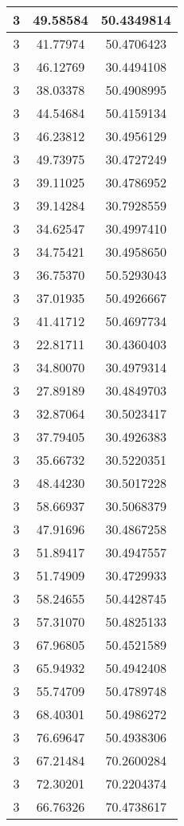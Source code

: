 \documentclass[
]{book}
\begin{document}
\begin{tabular}{c|c|c}
\hline
3 & 49.58584 & 50.4349814\\
\hline
3 & 41.77974 & 50.4706423\\
\hline
3 & 46.12769 & 30.4494108\\
\hline
3 & 38.03378 & 50.4908995\\
\hline
3 & 44.54684 & 50.4159134\\
\hline
3 & 46.23812 & 30.4956129\\
\hline
3 & 49.73975 & 30.4727249\\
\hline
3 & 39.11025 & 30.4786952\\
\hline
3 & 39.14284 & 30.7928559\\
\hline
3 & 34.62547 & 30.4997410\\
\hline
3 & 34.75421 & 30.4958650\\
\hline
3 & 36.75370 & 50.5293043\\
\hline
3 & 37.01935 & 50.4926667\\
\hline
3 & 41.41712 & 50.4697734\\
\hline
3 & 22.81711 & 30.4360403\\
\hline
3 & 34.80070 & 30.4979314\\
\hline
3 & 27.89189 & 30.4849703\\
\hline
3 & 32.87064 & 30.5023417\\
\hline
3 & 37.79405 & 30.4926383\\
\hline
3 & 35.66732 & 30.5220351\\
\hline
3 & 48.44230 & 30.5017228\\
\hline
3 & 58.66937 & 30.5068379\\
\hline
3 & 47.91696 & 30.4867258\\
\hline
3 & 51.89417 & 30.4947557\\
\hline
3 & 51.74909 & 30.4729933\\
\hline
3 & 58.24655 & 50.4428745\\
\hline
3 & 57.31070 & 50.4825133\\
\hline
3 & 67.96805 & 50.4521589\\
\hline
3 & 65.94932 & 50.4942408\\
\hline
3 & 55.74709 & 50.4789748\\
\hline
3 & 68.40301 & 50.4986272\\
\hline
3 & 76.69647 & 50.4938306\\
\hline
3 & 67.21484 & 70.2600284\\
\hline
3 & 72.30201 & 70.2204374\\
\hline
3 & 66.76326 & 70.4738617\\

\end{tabular}
\end{document}
